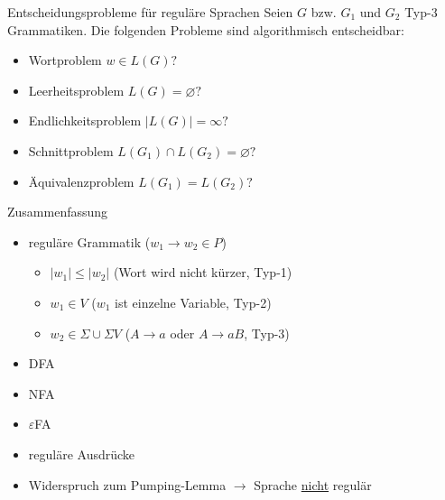 \begin{frame}{Entscheidungsprobleme für reguläre Sprachen}
	Seien $G$ bzw. $G_1$ und $G_2$ Typ-3 Grammatiken. Die folgenden
	Probleme sind algorithmisch entscheidbar:
	\begin{itemize}
		\item Wortproblem $w \in L(G)?$
		\item Leerheitsproblem $L(G) = \varnothing?$
		\item Endlichkeitsproblem $|L(G)|=\infty ?$
		\item Schnittproblem $L(G_1) \cap L(G_2) = \varnothing ?$
		\item Äquivalenzproblem $L(G_1) = L(G_2)?$
	\end{itemize}
\end{frame}

\begin{frame}{Zusammenfassung}
	\begin{itemize}
		\item reguläre Grammatik ($w_1 \rightarrow w_2 \in P$)
		\begin{itemize}
			\item $|w_1|\leq|w_2|$ (Wort wird nicht kürzer, Typ-1)
			\item $w_1 \in V$ ($w_1$ ist einzelne Variable, Typ-2)
			\item $w_2 \in \Sigma \cup \Sigma V$ ($A \rightarrow a$ oder $A \rightarrow aB$, Typ-3)
		\end{itemize}
		\item DFA
		\item NFA
		\item $\varepsilon$FA
		\item reguläre Ausdrücke
		\item Widerspruch zum Pumping-Lemma $\rightarrow$ Sprache \underline{nicht} regulär
	\end{itemize}
\end{frame}
